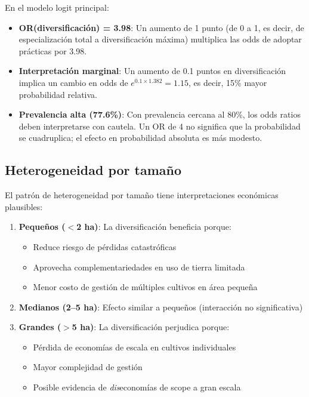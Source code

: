 \documentclass[11pt,a4paper]{article}
\begin{document}
En el modelo logit principal:
\begin{itemize}
    \item \textbf{OR(diversificación) = 3.98}: Un aumento de 1 punto (de 0 a 1, es decir, de especialización total a diversificación máxima) multiplica las odds de adoptar prácticas por 3.98.
    
    \item \textbf{Interpretación marginal}: Un aumento de 0.1 puntos en diversificación implica un cambio en odds de $e^{0.1 \times 1.382} = 1.15$, es decir, 15\% mayor probabilidad relativa.
    
    \item \textbf{Prevalencia alta (77.6\%)}: Con prevalencia cercana al 80\%, los odds ratios deben interpretarse con cautela. Un OR de 4 no significa que la probabilidad se cuadruplica; el efecto en probabilidad absoluta es más modesto.
\end{itemize}

\subsection{Heterogeneidad por tamaño}

El patrón de heterogeneidad por tamaño tiene interpretaciones económicas plausibles:

\begin{enumerate}
    \item \textbf{Pequeños ($<$2 ha)}: La diversificación beneficia porque:
    \begin{itemize}
        \item Reduce riesgo de pérdidas catastróficas
        \item Aprovecha complementariedades en uso de tierra limitada
        \item Menor costo de gestión de múltiples cultivos en área pequeña
    \end{itemize}
    
    \item \textbf{Medianos (2--5 ha)}: Efecto similar a pequeños (interacción no significativa)
    
    \item \textbf{Grandes ($>$5 ha)}: La diversificación perjudica porque:
    \begin{itemize}
        \item Pérdida de economías de escala en cultivos individuales
        \item Mayor complejidad de gestión
        \item Posible evidencia de \textit{dis}economías de scope a gran escala
    \end{itemize}
\end{enumerate}
\end{document}
